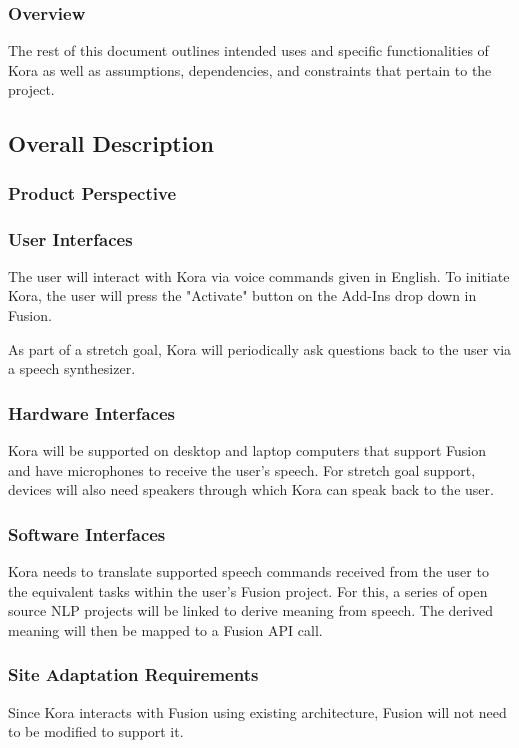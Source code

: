 \documentclass[onecolumn, draftclsnofoot,10pt, compsoc]{IEEEtran}
\def \botname{Kora\xspace}
\begin{document}
	\subsubsection{Overview}
	The rest of this document outlines intended uses and specific functionalities of \botname as well as assumptions, dependencies, and constraints that pertain to the project.

	\subsection{Overall Description}
	\subsubsection{Product Perspective}

	\subsubsection{User Interfaces}
	The user will interact with \botname via voice commands given in English.
	To initiate \botname, the user will press the "Activate" button on the Add-Ins drop down in Fusion.

	As part of a stretch goal, \botname will periodically ask questions back to the user via a speech synthesizer.

	\subsubsection{Hardware Interfaces}
	\botname will be supported on desktop and laptop computers that support Fusion and have microphones to receive the user's speech.
	For stretch goal support, devices will also need speakers through which \botname can speak back to the user.

	\subsubsection{Software Interfaces}
	\botname needs to translate supported speech commands received from the user to the equivalent tasks within the user's Fusion project.
	For this, a series of open source NLP projects will be linked to derive meaning from speech.
	The derived meaning will then be mapped to a Fusion API call.

	\subsubsection{Site Adaptation Requirements}
	Since \botname interacts with Fusion using existing architecture, Fusion will not need to be modified to support it.
\end{document}
